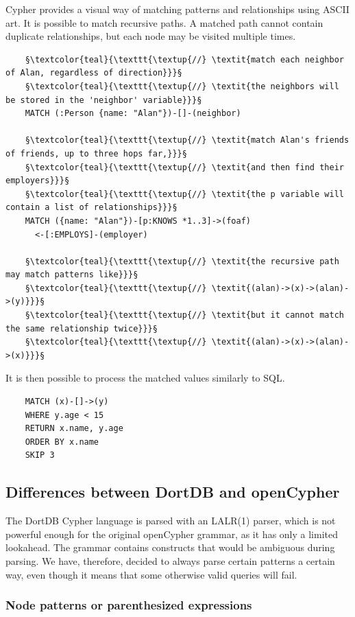 Cypher provides a visual way of matching patterns and relationships using ASCII art. It is possible to match recursive paths. A matched path cannot contain duplicate relationships, but each node may be visited multiple times.

\begin{verbatim}
    §\textcolor{teal}{\texttt{\textup{//} \textit{match each neighbor of Alan, regardless of direction}}}§
    §\textcolor{teal}{\texttt{\textup{//} \textit{the neighbors will be stored in the 'neighbor' variable}}}§
    MATCH (:Person {name: "Alan"})-[]-(neighbor)

    §\textcolor{teal}{\texttt{\textup{//} \textit{match Alan's friends of friends, up to three hops far,}}}§
    §\textcolor{teal}{\texttt{\textup{//} \textit{and then find their employers}}}§
    §\textcolor{teal}{\texttt{\textup{//} \textit{the p variable will contain a list of relationships}}}§
    MATCH ({name: "Alan"})-[p:KNOWS *1..3]->(foaf)
      <-[:EMPLOYS]-(employer)

    §\textcolor{teal}{\texttt{\textup{//} \textit{the recursive path may match patterns like}}}§
    §\textcolor{teal}{\texttt{\textup{//} \textit{(alan)->(x)->(alan)->(y)}}}§
    §\textcolor{teal}{\texttt{\textup{//} \textit{but it cannot match the same relationship twice}}}§
    §\textcolor{teal}{\texttt{\textup{//} \textit{(alan)->(x)->(alan)->(x)}}}§
\end{verbatim}

It is then possible to process the matched values similarly to SQL.

\begin{verbatim}
    MATCH (x)-[]->(y)
    WHERE y.age < 15
    RETURN x.name, y.age
    ORDER BY x.name
    SKIP 3
\end{verbatim}

\subsection{Differences between DortDB and openCypher}

The DortDB Cypher language is parsed with an LALR(1) parser, which is not powerful enough for the original openCypher grammar, as it has only a limited lookahead. The grammar contains constructs that would be ambiguous during parsing. We have, therefore, decided to always parse certain patterns a certain way, even though it means that some otherwise valid queries will fail.

\subsubsection*{Node patterns or parenthesized expressions}

